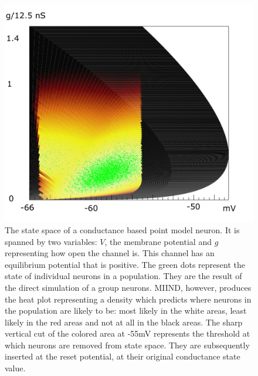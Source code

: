 \documentclass[utf8]{frontiersSCNS} %
\begin{document}
\begin{figure}[!htb]
  \centering
  \includegraphics[width=0.7\columnwidth]{images/cloud.png}

  \caption{The state space of a conductance based point model neuron. It is spanned by two variables: $V$, the membrane potential and $g$ representing how open the channel is. This channel has an equilibrium potential that is positive. The green dots represent the state of individual neurons in a population. They are the result of the direct simulation of a group neurons. MIIND, however, produces the heat plot representing a density which predicts where neurons in the population are likely to be: most likely in the white areas, least likely in  the red areas and not at all in the black areas. The sharp vertical cut of the colored area at -55mV represents the threshold at which neurons are removed from state space. They are subsequently inserted at the reset potential, at their original conductance state value.}
  \label{fig-cloud}
\end{figure}
\end{document}
